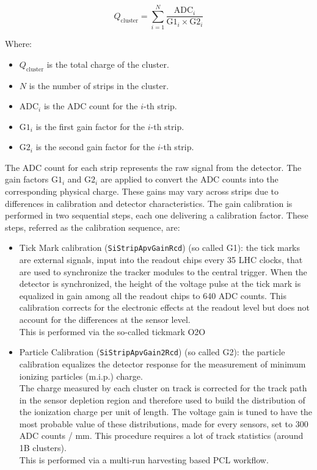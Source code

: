\[
Q_{\text{cluster}} = \sum_{i=1}^{N} \frac{\text{ADC}_i}{\text{G1}_i \times \text{G2}_i}
\]

Where:
\begin{itemize}
    \item \( Q_{\text{cluster}} \) is the total charge of the cluster.
    \item \( N \) is the number of strips in the cluster.
    \item \( \text{ADC}_i \) is the ADC count for the \( i \)-th strip.
    \item \( \text{G1}_i \) is the first gain factor for the \( i \)-th strip.
    \item \( \text{G2}_i \) is the second gain factor for the \( i \)-th strip.
\end{itemize}

The ADC count for each strip represents the raw signal from the detector. The gain factors \(\text{G1}_i\) and \(\text{G2}_i\) are applied to convert the ADC counts into the corresponding physical charge. These gains may vary across strips due to differences in calibration and detector characteristics.
The gain calibration is performed in two sequential steps, each one delivering a
calibration factor. These steps, referred as the calibration sequence, are:

\begin{itemize}
\item Tick Mark calibration (\texttt{SiStripApvGainRcd}) (so called G1): the tick marks are external signals, input into the readout chips every 35 LHC clocks, that are used to synchronize the tracker modules to the central trigger.
When the detector is synchronized, the height of the voltage pulse at the tick mark is equalized in gain among all the readout chips to 640 ADC counts. This calibration corrects for the electronic effects at the readout level but does not account for the differences at the sensor level.\\
This is performed via the so-called tickmark O2O 
\item Particle Calibration (\texttt{SiStripApvGain2Rcd}) (so called G2): the particle calibration equalizes the detector response for the measurement of minimum ionizing particles (m.i.p.) charge. \\
The charge measured by each cluster on track is corrected for the track path in the sensor depletion region and therefore used to build the distribution of the ionization charge per unit of length. The voltage gain is tuned to have the most probable value of these distributions, made for every sensors, set to 300 ADC counts / mm. This procedure requires a lot of track statistics (around 1B clusters).\\
This is performed via a multi-run harvesting based PCL workflow.
\end{itemize}


